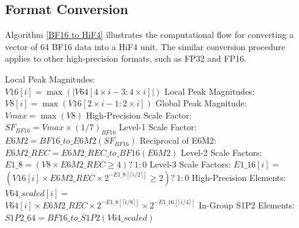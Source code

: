 


\subsection{Format Conversion} \label{HiF4_convert}

Algorithm \ref{BF16 to HiF4} illustrates the computational flow for 
converting a vector of 64 BF16 data into a HiF4 unit. 
The similar conversion procedure applies to other high-precision formats, 
such as FP32 and FP16.


\begin{algorithm}
  \caption{Conversion from BF16 to HiF4}
  \label{BF16 to HiF4}
  \begin{algorithmic}[1]
       Local Peak Magnitudes: \\
      $V16[i] = \max(|V64[4 \times i - 3 : 4 \times i]|)$ 
    \ENDFOR 
       Local Peak Magnitudes: \\
      $V8[i] = \max(V16[2 \times i - 1 : 2 \times i])$ 
    \ENDFOR 
    \STATE Global Peak Magnitude: $Vmax = \max(V8)$
    \STATE High-Precision Scale Factor: \\
    $SF_{BF16} = Vmax \times (1/7)_{BF16}$
    \STATE Level-1 Scale Factor: \\
    $E6M2 = BF16\_to\_E6M2(SF_{BF16})$
    \STATE Reciprocal of E6M2: \\
    $E6M2\_REC = E6M2\_REC\_to\_BF16(E6M2)$
    \STATE Level-2 Scale Factors: \\
    $E1\_8 = (V8 \times E6M2\_REC \ge 4)?\  1:0 $
      \STATE Level-3 Scale Factors: $E1\_16[i] = $ \\
      $(V16[i] \times E6M2\_REC \times 2^{-E1\_8[\lceil i/2 \rceil]} \ge 2)?\  1:0 $
    \ENDFOR
      \STATE High-Precision Elements: $V64\_scaled[i] = $ \\
      $V64[i] \times E6M2\_REC \times 2^{-E1\_8[\lceil i/8 \rceil]} \times 2^{-E1\_16[\lceil i/4 \rceil]}$
    \ENDFOR
    \STATE In-Group S1P2 Elements: \\
    $S1P2\_64 = BF16\_to\_S1P2(V64\_scaled)$
  \end{algorithmic}  
\end{algorithm}

